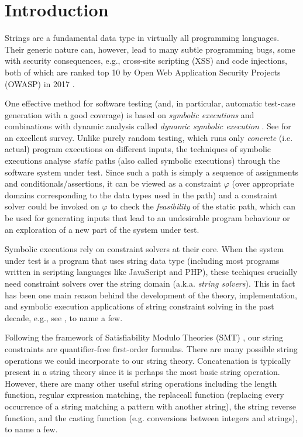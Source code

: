 \section{Introduction}
\label{sec:intro}

Strings are a fundamental data type in virtually all programming languages.
Their generic nature can, however, lead to many subtle programming 
bugs, some with security consequences, e.g., cross-site scripting
(XSS) and code injections, both of which are ranked top 10 by Open Web
Application Security Projects (OWASP) in 2017 \cite{owasp17}. 

One effective
method for software testing (and, in particular, automatic test-case 
generation with a good coverage) is based on \emph{symbolic executions} 
\cite{king76} and combinations with dynamic analysis
called \emph{dynamic symbolic execution} \cite{jalangi,DART,EXE,CUTE,KLEE}.
See \cite{symbex-survey} for an excellent survey. Unlike purely random testing,
which runs only \emph{concrete} (i.e. actual) program executions on different 
inputs, the techniques of symbolic executions analyse \emph{static} paths
(also called symbolic executions) through the software system under test.
Since such a path is simply a sequence of assignments and
conditionals/assertions, it can be viewed as a constraint $\varphi$ (over 
appropriate domains corresponding to the data types used in the path) and a 
constraint solver could be invoked on $\varphi$ to check the \emph{feasibility}
of the static path, which can be used for generating inputs that lead to 
an undesirable program behaviour or an exploration of a new part of the
system under test.

Symbolic executions rely on constraint solvers at their core. When the system
under test is a program that uses string data type (including most programs 
written in scripting languages like JavaScript and PHP), these techiques 
crucially need constraint solvers over the string domain (a.k.a. \emph{string 
solvers}). This in fact has been one main reason behind the development of
the theory, implementation, and symbolic execution applications of string constraint 
solving in the past decade, e.g., see 
\cite{BTV09,Berkeley-JavaScript,HAMPI,Stranger,Vijay-length,YABI14,Abdulla14,LB16,fang-yu-circuits,Abdulla17,CCHLW18,HJLRV18,S3,TCJ16,Z3-str,cvc4,BCFJKKV08,RVG12,jalangi,expose},
to name a few. 

Following the framework of Satisfiability Modulo Theories (SMT)
\cite{SMT-CACM,SMT-chapter,KS08}, our string constraints are quantifier-free
first-order formulas. 
There are many possible string operations we could incorporate to our string 
theory.
Concatenation is typically present in a string theory since it is perhaps
the most basic string operation. However, there are many other useful string 
operations including the length function, regular expression matching, the 
replaceall
function (replacing every occurrence of a string matching a pattern with another
string), the string reverse function, and the casting function (e.g. conversions
between integers and strings), to name a few. 

